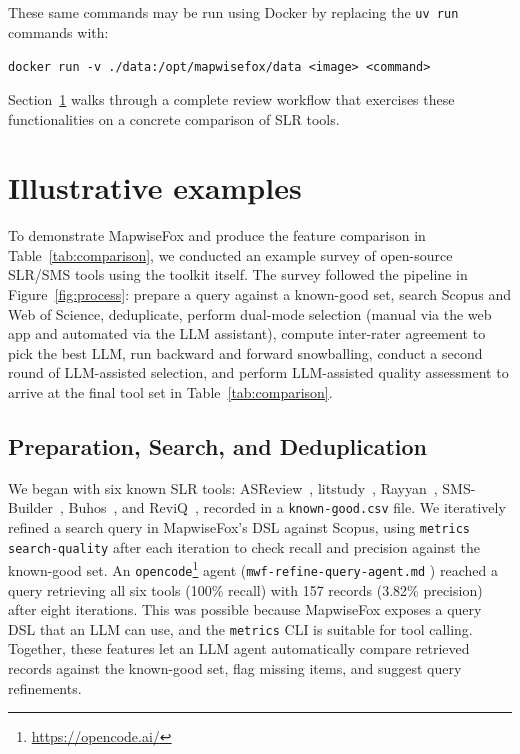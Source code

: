 \documentclass[preprint,12pt, a4paper]{elsarticle}
\begin{document}
These same commands may be run using Docker by replacing the \texttt{uv run}
commands with:
\begin{center}
  \texttt{docker run -v ./data:/opt/mapwisefox/data <image> <command>}
\end{center}

Section~\ref{sec:example} walks through a complete review workflow that exercises these
functionalities on a concrete comparison of SLR tools.


\section{Illustrative examples}\label{sec:example}

To demonstrate MapwiseFox and produce the feature comparison in
Table~\ref{tab:comparison}, we conducted an example survey of open-source
SLR/SMS tools using the toolkit itself. The survey followed the pipeline in
Figure~\ref{fig:process}: prepare a query against a known-good set,
search Scopus and Web of Science, deduplicate, perform dual-mode selection
(manual via the web app and automated via the LLM assistant), compute inter-rater
agreement to pick the best LLM, run backward and forward snowballing, conduct
a second round of LLM-assisted selection, and perform LLM-assisted quality
assessment to arrive at the final tool set in Table~\ref{tab:comparison}.

\subsection{Preparation, Search, and Deduplication}

We began with six known SLR tools: ASReview~\cite{van2021},
litstudy~\cite{litstudy2022}, Rayyan~\cite{rayyan2016},
SMS-Builder~\cite{smsbuilder2022}, Buhos~\cite{buhos2018}, and
ReviQ~\cite{reviq2026}, recorded in a \texttt{known-good.csv} file. We
iteratively refined a search query in MapwiseFox's DSL against Scopus,
using \texttt{metrics search-quality} after each iteration to check recall
and precision against the known-good set. An
\texttt{opencode}\footnote{\url{https://opencode.ai/}} agent
(\texttt{mwf-\allowbreak refine-\allowbreak query-\allowbreak agent.md}
\cite{olar2026-config-examples}) reached a query retrieving all six tools
(100\% recall) with 157 records (3.82\% precision) after eight iterations.
This was possible because MapwiseFox exposes a query DSL that an LLM can use,
and the \texttt{metrics} CLI is suitable for tool calling. Together, these
features let an LLM agent automatically compare retrieved records against the
known-good set, flag missing items, and suggest query refinements.
\end{document}
